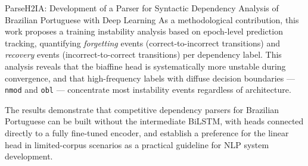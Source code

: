 \begin{englishabstract}{ParseH2IA: Development of a Parser for Syntactic Dependency Analysis of Brazilian Portuguese with Deep Learning}
As a methodological contribution, this work proposes a training instability analysis based on
epoch-level prediction tracking, quantifying \textit{forgetting} events (correct-to-incorrect
transitions) and \textit{recovery} events (incorrect-to-correct transitions) per dependency
label. This analysis reveals that the biaffine head is systematically more unstable during
convergence, and that high-frequency labels with diffuse decision boundaries ---
\texttt{nmod} and \texttt{obl} --- concentrate most instability events regardless of
architecture.

The results demonstrate that competitive dependency parsers for Brazilian Portuguese can be
built without the intermediate BiLSTM, with heads connected directly to a fully fine-tuned
encoder, and establish a preference for the linear head in limited-corpus scenarios as a
practical guideline for NLP system development.

\end{englishabstract}
